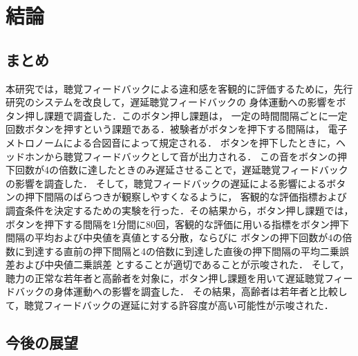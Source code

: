 \chapter{結論}
\section{まとめ}
本研究では，聴覚フィードバックによる違和感を客観的に評価するために，先行研究のシステムを改良して，遅延聴覚フィードバックの
身体運動への影響をボタン押し課題で調査した．このボタン押し課題は，
一定の時間間隔ごとに一定回数ボタンを押すという課題である．被験者がボタンを押下する間隔は，
電子メトロノームによる合図音によって規定される．
ボタンを押下したときに，ヘッドホンから聴覚フィードバックとして音が出力される．
この音をボタンの押下回数が4の倍数に達したときのみ遅延させることで，遅延聴覚フィードバックの影響を調査した．
そして，聴覚フィードバックの遅延による影響によるボタンの押下間隔のばらつきが観察しやすくなるように，
客観的な評価指標および調査条件を決定するための実験を行った．その結果から，ボタン押し課題では，
ボタンを押下する間隔を1分間に80回，客観的な評価に用いる指標をボタン押下間隔の平均および中央値を真値とする分散，ならびに
ボタンの押下回数が4の倍数に到達する直前の押下間隔と4の倍数に到達した直後の押下間隔の平均二乗誤差および中央値二乗誤差
とすることが適切であることが示唆された．
そして，聴力の正常な若年者と高齢者を対象に，ボタン押し課題を用いて遅延聴覚フィードバックの身体運動への影響を調査した．
その結果，高齢者は若年者と比較して，聴覚フィードバックの遅延に対する許容度が高い可能性が示唆された．


\section{今後の展望}
